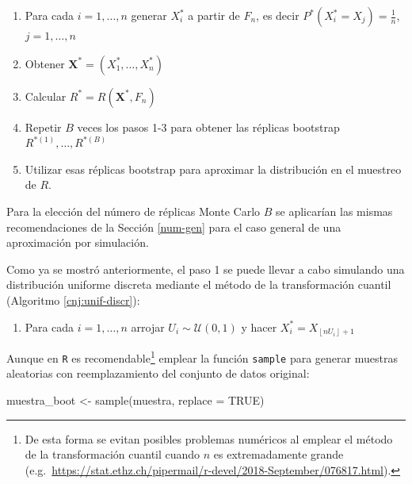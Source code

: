\documentclass[
]{book}
\newenvironment{Shaded}{\begin{snugshade}}{\end{snugshade}}
\newcommand{\AttributeTok}[1]{\textcolor[rgb]{0.77,0.63,0.00}{#1}}
\newcommand{\ConstantTok}[1]{\textcolor[rgb]{0.00,0.00,0.00}{#1}}
\newcommand{\FunctionTok}[1]{\textcolor[rgb]{0.00,0.00,0.00}{#1}}
\newcommand{\NormalTok}[1]{#1}
\newcommand{\OtherTok}[1]{\textcolor[rgb]{0.56,0.35,0.01}{#1}}
\providecommand{\tightlist}{%
  \setlength{\itemsep}{0pt}\setlength{\parskip}{0pt}}
\theoremstyle{break}
\theoremstyle{nonumberplain}
\begin{document}
\begin{enumerate}
\def\labelenumi{\arabic{enumi}.}
\item
  Para cada \(i=1,\ldots ,n\) generar \(X_i^{\ast}\) a partir de \(F_n\), es decir
  \(P^{\ast}\left( X_i^{\ast}=X_j \right) =\frac{1}{n}\), \(j=1,\ldots,n\)
\item
  Obtener \(\mathbf{X}^{\ast}=\left( X_1^{\ast},\ldots ,X_n^{\ast} \right)\)
\item
  Calcular \(R^{\ast}=R\left( \mathbf{X}^{\ast},F_n \right)\)
\item
  Repetir \(B\) veces los pasos 1-3 para obtener las réplicas bootstrap
  \(R^{\ast (1)}, \ldots, R^{\ast (B)}\)
\item
  Utilizar esas réplicas bootstrap para aproximar la distribución en el
  muestreo de \(R\).
\end{enumerate}

Para la elección del número de réplicas Monte Carlo \(B\) se aplicarían las mismas recomendaciones de la Sección \ref{num-gen} para el caso general de una aproximación por simulación.

Como ya se mostró anteriormente, el paso 1 se puede llevar a cabo simulando una distribución uniforme discreta mediante el método de la transformación cuantil (Algoritmo \ref{cnj:unif-discr}):

\begin{enumerate}
\def\labelenumi{\arabic{enumi}.}
\tightlist
\item
  Para cada \(i=1,\ldots ,n\) arrojar \(U_i\sim \mathcal{U}\left( 0,1 \right)\) y
  hacer \(X_i^{\ast}=X_{\left\lfloor nU_i\right\rfloor +1}\)
\end{enumerate}

Aunque en \texttt{R} es recomendable\footnote{De esta forma se evitan posibles problemas numéricos al emplear el método de la transformación cuantil cuando \(n\) es extremadamente grande (e.g.~\url{https://stat.ethz.ch/pipermail/r-devel/2018-September/076817.html}).} emplear la función \texttt{sample} para generar muestras aleatorias con reemplazamiento del conjunto de datos original:

\begin{Shaded}
\begin{Highlighting}[]
\NormalTok{muestra\_boot }\OtherTok{\textless{}{-}} \FunctionTok{sample}\NormalTok{(muestra, }\AttributeTok{replace =} \ConstantTok{TRUE}\NormalTok{)}
\end{Highlighting}
\end{Shaded}
\end{document}
